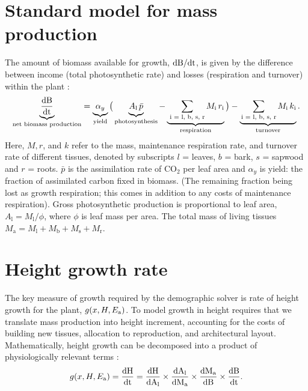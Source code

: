 \documentclass[10pt,twoside]{article}
\begin{document}
\section{Standard model for mass
production}\label{standard-model-for-mass-production}

The amount of biomass available for growth,
\(\rm{d}B / \rm{d}t\), is given by the difference between income
(total photosynthetic rate) and losses (respiration and turnover) within the
plant \citep{Makela-1997, Thornley-2000, Falster-2011}:
\begin{equation}\label{eq:dbdt}
\underbrace{\strut \frac{\rm{d}B}{\rm{d}t}}_\textrm{net biomass production}
  = \underbrace{\strut \alpha_{y}}_\textrm{yield}
    \big( \underbrace{\strut A_\textrm{l} \, \bar{p}}_\textrm{photosynthesis} -
     \underbrace{\strut \, \sum_\textrm{i = l, b, s, r}{M_\textrm{i} \, r_\textrm{i}}}_\textrm{respiration}\big)
    - \underbrace{\strut \sum_\textrm{i = l, b, s, r}{M_\textrm{i} \, k_\textrm{i}}}_\textrm{turnover}.
\end{equation}
Here, \(M, r\), and \(k\) refer to the mass, maintenance respiration rate, and
turnover rate of different tissues, denoted by subscripts \(l\) = leaves,
\(b\) = bark, \(s\) = sapwood and \(r\) = roots. \(\bar{p}\) is the assimilation
rate of CO\(_2\) per leaf area and \(\alpha_{y}\) is yield: the fraction of
assimilated carbon fixed in biomass. (The remaining fraction being lost
as growth respiration; this comes in addition
to any costs of maintenance respiration). Gross photosynthetic production is proportional to leaf area,
\(A_\textrm{l} = M_\textrm{l} / \phi\), where \(\phi\) is leaf mass per
area. The total mass of living tissues
\(M_\textrm{a} = M_\textrm{l} + M_\textrm{b} + M_\textrm{s} + M_\textrm{r}.\)

\section{Height growth rate}\label{height-growth-rate}

The key measure of growth required by the demographic solver is
rate of height growth for the plant, $g(x, H, E_{\rm a})$. To model growth in
height requires that we translate mass
production into height increment, accounting for the costs of
building new tissues, allocation
to reproduction, and architectural layout. Mathematically, height growth
can be decomposed into a product of physiologically relevant terms
\citep{Falster-2011}:
\begin{equation} \label{eq:dhdt}
g(x, H, E_{\rm a}) = \frac{\rm{d}H}{\rm{d}t} = \frac{\rm{d}H}{\rm{d}A_\textrm{l}}
\times \frac{\rm{d}A_\textrm{l}}{\rm{d}M_\textrm{a}}
\times \frac{\rm{d}M_\textrm{a}}{\rm{d}B}
\times \frac{\rm{d}B}{\rm{d}t}.
\end{equation}
\end{document}
